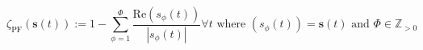 \begin{equation}
	\zeta_\text{PF}(\textbf{s}(t)):= 1 - \sum_{\phi=1}^{\Phi}\frac{\text{Re}(s_\phi(t))}{|s_\phi(t)|} \forall t \text{ where } (s_\phi(t)) = \textbf{s}(t) \text{ and } \Phi \in \mathbb{Z}_{>0}
\label{ch1:equ:power-factor}
\end{equation}